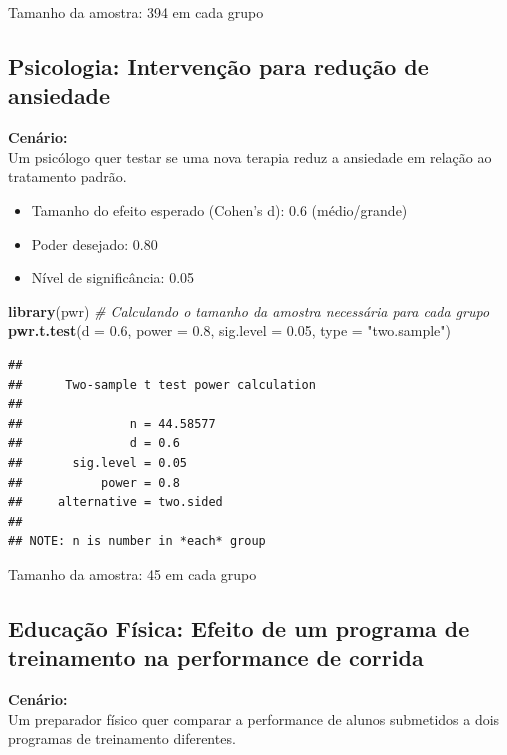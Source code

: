 \documentclass[
]{book}
\newenvironment{Shaded}{\begin{snugshade}}{\end{snugshade}}
\newcommand{\AttributeTok}[1]{\textcolor[rgb]{0.13,0.29,0.53}{#1}}
\newcommand{\CommentTok}[1]{\textcolor[rgb]{0.56,0.35,0.01}{\textit{#1}}}
\newcommand{\FloatTok}[1]{\textcolor[rgb]{0.00,0.00,0.81}{#1}}
\newcommand{\FunctionTok}[1]{\textcolor[rgb]{0.13,0.29,0.53}{\textbf{#1}}}
\newcommand{\NormalTok}[1]{#1}
\newcommand{\StringTok}[1]{\textcolor[rgb]{0.31,0.60,0.02}{#1}}
\providecommand{\tightlist}{%
  \setlength{\itemsep}{0pt}\setlength{\parskip}{0pt}}
\begin{document}
Tamanho da amostra: 394 em cada grupo

\subsection{Psicologia: Intervenção para redução de ansiedade}\label{psicologia-intervenuxe7uxe3o-para-reduuxe7uxe3o-de-ansiedade}

\textbf{Cenário:}\\
Um psicólogo quer testar se uma nova terapia reduz a ansiedade em relação ao tratamento padrão.

\begin{itemize}
\tightlist
\item
  Tamanho do efeito esperado (Cohen's d): 0.6 (médio/grande)\\
\item
  Poder desejado: 0.80\\
\item
  Nível de significância: 0.05
\end{itemize}

\begin{Shaded}
\begin{Highlighting}[]
\FunctionTok{library}\NormalTok{(pwr)}
\CommentTok{\# Calculando o tamanho da amostra necessária para cada grupo}
\FunctionTok{pwr.t.test}\NormalTok{(}\AttributeTok{d =} \FloatTok{0.6}\NormalTok{, }\AttributeTok{power =} \FloatTok{0.8}\NormalTok{, }\AttributeTok{sig.level =} \FloatTok{0.05}\NormalTok{, }\AttributeTok{type =} \StringTok{"two.sample"}\NormalTok{)}
\end{Highlighting}
\end{Shaded}

\begin{verbatim}
## 
##      Two-sample t test power calculation 
## 
##               n = 44.58577
##               d = 0.6
##       sig.level = 0.05
##           power = 0.8
##     alternative = two.sided
## 
## NOTE: n is number in *each* group
\end{verbatim}

Tamanho da amostra: 45 em cada grupo

\subsection{Educação Física: Efeito de um programa de treinamento na performance de corrida}\label{educauxe7uxe3o-fuxedsica-efeito-de-um-programa-de-treinamento-na-performance-de-corrida}

\textbf{Cenário:}\\
Um preparador físico quer comparar a performance de alunos submetidos a dois programas de treinamento diferentes.
\end{document}
